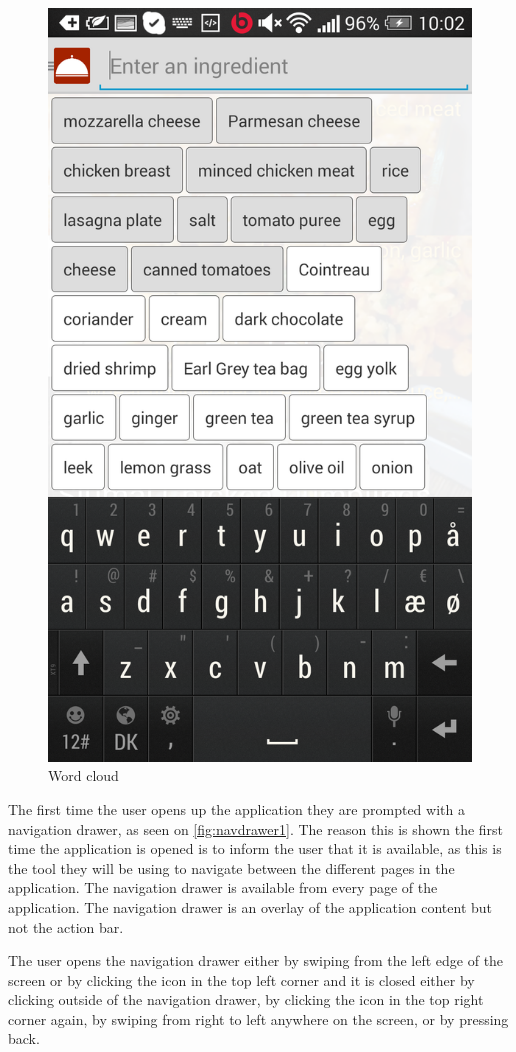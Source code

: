 \begin{figure}[H]
\begin{minipage}[t]{0.5\columnwidth}
\includegraphics[width=0.7\columnwidth]{img/screenshots/finalwordcloud.png}
\caption{Word cloud\label{fig:wordcloud}}
\end{minipage}
\end{figure}

The first time the user opens up the application they are prompted with a navigation drawer, as seen on \autoref{fig:navdrawer1}. The reason this is shown the first time the application is opened is to inform the user that it is available, as this is the tool they will be using to navigate between the different pages in the application. The navigation drawer is available from every page of the application. The navigation drawer is an overlay of the application content but not the action bar\citep{guidelines-navigationdrawer}.

The user opens the navigation drawer either by swiping from the left edge of the screen or by clicking the icon in the top left corner and it is closed either by clicking outside of the navigation drawer, by clicking the icon in the top right corner again, by swiping from right to left anywhere on the screen, or by pressing back.

